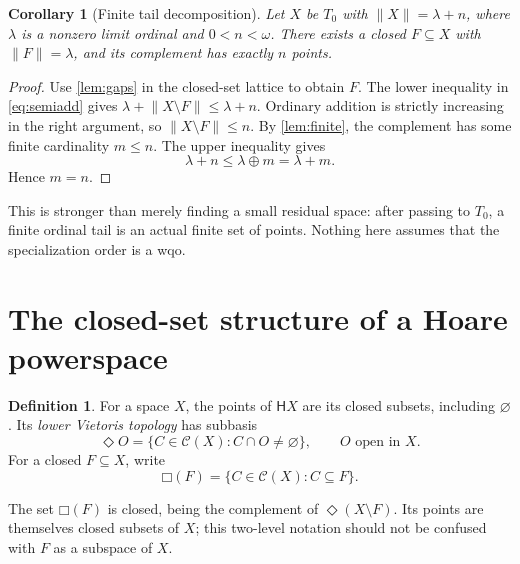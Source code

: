 \documentclass[11pt,a4paper]{article}
\newtheorem{corollary}[corollary]{Corollary}
\theoremstyle{definition}
\newtheorem{definition}[definition]{Definition}
\newcommand{\Cl}{\mathcal C}
\newcommand{\HH}{\mathsf H}
\newcommand{\st}[1]{\lVert #1\rVert}
\newcommand{\boxF}[1]{\mathord{\Box}(#1)}
\numberwithin{equation}{section}
\begin{document}
\begin{corollary}[Finite tail decomposition]\label{cor:tail}
Let $X$ be $T_0$ with $\st X=\lambda+n$, where $\lambda$ is a nonzero
limit ordinal and $0<n<\omega$.  There exists a closed $F\subseteq X$
with $\st F=\lambda$, and its complement has exactly $n$ points.
\end{corollary}
\begin{proof}
Use \cref{lem:gaps} in the closed-set lattice to obtain $F$.  The lower
inequality in \eqref{eq:semiadd} gives
$\lambda+\st{X\setminus F}\leq\lambda+n$.  Ordinary addition is strictly
increasing in the right argument, so $\st{X\setminus F}\leq n$.
By \cref{lem:finite}, the complement has some finite cardinality $m\leq n$.
The upper inequality gives
\[
 \lambda+n\leq\lambda\oplus m=\lambda+m.
\]
Hence $m=n$.
\end{proof}

This is stronger than merely finding a small residual space: after
passing to $T_0$, a finite ordinal tail is an actual finite set of points.
Nothing here assumes that the specialization order is a wqo.

\section{The closed-set structure of a Hoare powerspace}
\label{sec:hoare}

\begin{definition}
For a space $X$, the points of $\HH X$ are its closed subsets, including
$\varnothing$.  Its \emph{lower Vietoris topology} has subbasis
\[
 \Diamond O=\{C\in\Cl(X):C\cap O\ne\varnothing\},\qquad O\text{ open in }X.
\]
For a closed $F\subseteq X$, write
\[
 \boxF F=\{C\in\Cl(X):C\subseteq F\}.
\]
\end{definition}

The set $\boxF F$ is closed, being the complement of
$\Diamond(X\setminus F)$.  Its points are themselves closed subsets of
$X$; this two-level notation should not be confused with $F$ as a
subspace of $X$.
\end{document}
